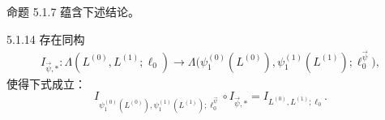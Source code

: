 命题 5.1.7 蕴含下述结论。

\begin{corollary}{5.1.14}\label{cor:5-1-14}
存在同构
\[
\begin{aligned}
I_{\vec\psi,*}:
\Lambda(L^{(0)},L^{(1)};\ell_0)
\longrightarrow
\Lambda\bigl(
\psi_1^{(0)}(L^{(0)}),
\psi_1^{(1)}(L^{(1)});
\ell_0^{\vec\psi}\bigr),
\end{aligned}
\]
使得下式成立：
\[
I_{\psi_1^{(0)}(L^{(0)}),
   \psi_1^{(1)}(L^{(1)});
   \ell_0^{\vec\psi}}
\circ I_{\vec\psi,*}
=I_{L^{(0)},L^{(1)};\ell_0}.
\]
\end{corollary}
